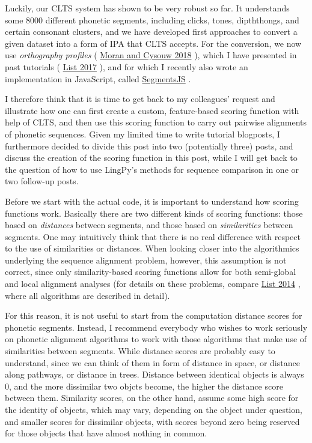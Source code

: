 \documentclass[
  a4paper,
  14pt,
  oneside,
  tablecaptionabove
]{scrbook}
\begin{document}
Luckily, our CLTS system has shown to be very robust so far. It
understands some 8000 different phonetic segments, including clicks,
tones, dipththongs, and certain consonant clusters, and we have
developed first approaches to convert a given dataset into a form of IPA
that CLTS accepts. For the conversion, we now use \emph{orthography
profiles} ( \href{http://bibliography.lingpy.org?key=Moran2018}{Moran
and Cysouw 2018} ), which I have presented in past tutorials (
\href{http://bibliography.lingpy.org?key=List2017LECTUREd}{List 2017} ),
and for which I recently also wrote an implementation in JavaScript,
called \href{http://calc.digling.org/}{SegmentsJS} .

I therefore think that it is time to get back to my colleagues' request
and illustrate how one can first create a custom, feature-based scoring
function with help of CLTS, and then use this scoring function to carry
out pairwise alignments of phonetic sequences. Given my limited time to
write tutorial blogposts, I furthermore decided to divide this post into
two (potentially three) posts, and discuss the creation of the scoring
function in this post, while I will get back to the question of how to
use LingPy's methods for sequence comparison in one or two follow-up
posts.

Before we start with the actual code, it is important to understand how
scoring functions work. Basically there are two different kinds of
scoring functions: those based on \emph{distances} between segments, and
those based on \emph{similarities} between segments. One may intuitively
think that there is no real difference with respect to the use of
similarities or distances. When looking closer into the algorithmics
underlying the sequence alignment problem, however, this assumption is
not correct, since only similarity-based scoring functions allow for
both semi-global and local alignment analyses (for details on these
problems, compare
\href{http://bibliography.lingpy.org?key=List2014d}{List 2014} , where
all algorithms are described in detail).

For this reason, it is not useful to start from the computation distance
scores for phonetic segments. Instead, I recommend everybody who wishes
to work seriously on phonetic alignment algorithms to work with those
algorithms that make use of similarities between segments. While
distance scores are probably easy to understand, since we can think of
them in form of distance in space, or distance along pathways, or
distance in trees. Distance between identical objects is always 0, and
the more dissimilar two objcts become, the higher the distance score
between them. Similarity scores, on the other hand, assume some high
score for the identity of objects, which may vary, depending on the
object under question, and smaller scores for dissimilar objects, with
scores beyond zero being reserved for those objects that have almost
nothing in common.
\end{document}
